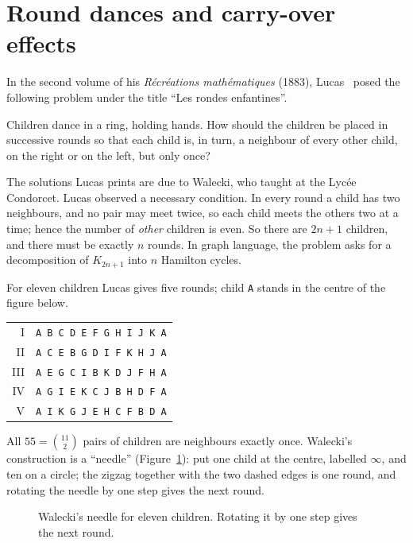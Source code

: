 \section{Round dances and carry-over effects}\label{sec:round-dances}


In the second volume of his \emph{R\'ecr\'eations math\'ematiques} (1883), Lucas~\cite{luc1883} posed the following problem under the title ``Les rondes enfantines''.

\begin{problem}[Lucas, 1883]\label{prob:lucas}
Children dance in a ring, holding hands. How should the children be placed in successive rounds so that each child is, in turn, a neighbour of every other child, on the right or on the left, but only once?
\end{problem}

The solutions Lucas prints are due to Walecki, who taught at the Lyc\'ee Condorcet. Lucas observed a necessary condition. In every round a child has two neighbours, and no pair may meet twice, so each child meets the others two at a time; hence the number of \emph{other} children is even. So there are $2n+1$ children, and there must be exactly $n$ rounds. In graph language, the problem asks for a decomposition of $K_{2n+1}$ into $n$ Hamilton cycles.

For eleven children Lucas gives five rounds; child \texttt{A} stands in the centre of the figure below.
\begin{center}
\begin{tabular}{rl}
I & \texttt{A B C D E F G H I J K A}\\
II & \texttt{A C E B G D I F K H J A}\\
III & \texttt{A E G C I B K D J F H A}\\
IV & \texttt{A G I E K C J B H D F A}\\
V & \texttt{A I K G J E H C F B D A}
\end{tabular}
\end{center}
All $55=\binom{11}{2}$ pairs of children are neighbours exactly once. Walecki's construction is a ``needle'' (Figure~\ref{fig:walecki}): put one child at the centre, labelled $\infty$, and ten on a circle; the zigzag together with the two dashed edges is one round, and rotating the needle by one step gives the next round.

\begin{figure}[ht]
\centering

\caption{Walecki's needle for eleven children. Rotating it by one step gives the next round.}
\label{fig:walecki}
\end{figure}

